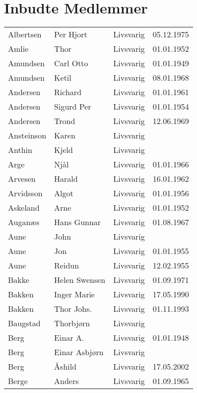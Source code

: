 ﻿
\chapter*{Inbudte Medlemmer}

    \begin{longtable}{llll}
        Albertsen	&	Per Hjort	&	Livsvarig 	&	05.12.1975	\\
        Amlie	&	Thor	&	Livsvarig 	&	01.01.1952	\\
        Amundsen	&	Carl Otto	&	Livsvarig 	&	01.01.1949	\\
        Amundsen	&	Ketil	&	Livsvarig 	&	08.01.1968	\\
        Andersen	&	Richard	&	Livsvarig 	&	01.01.1961	\\
        Andersen	&	Sigurd Per	&	Livsvarig 	&	01.01.1954	\\
        Andersen	&	Trond	&	Livsvarig 	&	12.06.1969	\\
        Ansteinson	&	Karen	&	Livsvarig 	&		\\
        Anthin	&	Kjeld	&	Livsvarig 	&		\\
        Arge	&	Njål	&	Livsvarig 	&	01.01.1966	\\
        Arvesen	&	Harald	&	Livsvarig 	&	16.01.1962	\\
        Arvidsson	&	Algot	&	Livsvarig 	&	01.01.1956	\\
        Askeland	&	Arne	&	Livsvarig 	&	01.01.1952	\\
        Auganæs	&	Hans Gunnar	&	Livsvarig 	&	01.08.1967	\\
        Aune	&	John	&	Livsvarig 	&		\\
        Aune	&	Jon	&	Livsvarig 	&	01.01.1955	\\
        Aune	&	Reidun	&	Livsvarig 	&	12.02.1955	\\
        Bakke	&	Helen Swensen	&	Livsvarig 	&	01.09.1971	\\
        Bakken	&	Inger Marie	&	Livsvarig 	&	17.05.1990	\\
        Bakken	&	Thor Johs.	&	Livsvarig 	&	01.11.1993	\\
        Baugstad	&	Thorbjørn	&	Livsvarig 	&		\\
        Berg	&	Einar A.	&	Livsvarig 	&	01.01.1948	\\
        Berg	&	Einar Asbjørn	&	Livsvarig 	&		\\
        Berg 	&	Åshild	&	Livsvarig	&	17.05.2002	\\
        Berge	&	Anders	&	Livsvarig 	&	01.09.1965	\\

\end{longtable}
